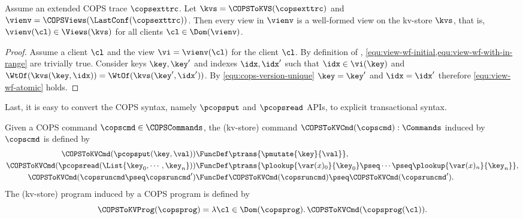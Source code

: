 \begin{proposition}
Assume an extended COPS trace \( \copsexttrc \).
Let \( \kvs = \COPSToKVS(\copsexttrc) \) and \( \vienv = \COPSViews(\LastConf(\copsexttrc)) \).
Then every view in \( \vienv \) is a well-formed view on the kv-store \( \kvs \),
that is, \( \vienv(\cl) \in \Views(\kvs) \) for all clients \( \cl \in \Dom(\vienv) \).
\end{proposition}
\begin{proof}
Assume a client \( \cl \) and the view \( \vi = \vienv(\cl) \) for the client \( \cl \).
By definition of \COPSViews, \cref{equ:view-wf-initial,equ:view-wf-with-in-range} are trivially true.
Consider keys \( \key,\key' \) and indexes \( \idx,\idx' \) 
such that \( \idx \in \vi(\key) \) and \( \WtOf(\kvs(\key,\idx)) = \WtOf(\kvs(\key',\idx')) \).
By \cref{equ:cops-version-unique} \( \key = \key' \) and \( \idx = \idx' \)
therefore \cref{equ:view-wf-atomic} holds.
\end{proof}

Last, it is easy to convert the COPS syntax, namely \( \pcopsput\) and \( \pcopsread \) APIs,
to explicit transactional syntax.

\begin{definition}
Given a COPS command \( \copscmd \in \COPSCommands \),
the (kv-store) command \( \COPSToKVCmd(\copscmd) : \Commands \) induced by \( \copscmd \) is defined by
\begin{align*}
   \COPSToKVCmd(\pcopsput(\key,\val)) & \FuncDef \ptrans{ \pmutate{\key}{\val} } ,
\\ \COPSToKVCmd(\pcopsread(\List{\key_0, \cdots, \key_n })) 
        & \FuncDef \ptrans{ \plookup{\var(x)_0}{\key_0} \pseq \cdots \pseq \plookup{\var(x)_n}{\key_n}  } ,
\\ \COPSToKVCmd(\copsruncmd \pseq \copsruncmd' ) 
        & \FuncDef \COPSToKVCmd(\copsruncmd) \pseq \COPSToKVCmd(\copsruncmd') .
\end{align*}                                                                 
The (kv-store) program induced by a COPS program is defined by
\[
    \COPSToKVProg(\copsprog) = \lambda \cl \in \Dom(\copsprog) \ldotp \COPSToKVCmd(\copsprog(\cl)) .
\]
\end{definition}

